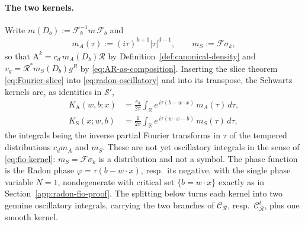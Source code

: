 \documentclass[12pt]{article}
\numberwithin{equation}{section}
\numberwithin{figure}{section}
\numberwithin{equation}{section}
\newcommand{\R}{\mathbb{R}}
\newcommand{\abs}[1]{\left|#1\right|}
\begin{document}
\paragraph{The two kernels.}
Write $m(D_b):=\mathcal F_b^{-1}m\,\mathcal F_b$ and
\begin{align}
    m_A(\tau):=(i\tau)^{k+1}\abs{\tau}^{d-1},
    \qquad
    m_S:=\mathcal F\sigma_k ,
    \label{eq:two-multipliers}
\end{align}
so that $\mathrm{A}^k=c_d\,m_A(D_b)\mathcal R$ by Definition~\ref{def:canonical-density}
and $v_g=\mathcal R^{*}m_S(D_b)g^{R}$ by \eqref{eq:AR-as-composition}.  Inserting the slice theorem \eqref{eq:Fourier-slice} into \eqref{eq:radon-oscillatory}
and into its transpose, the Schwartz kernels are, as identities in $\mathcal S'$,
\begin{align}
    K_{\mathrm A}(w,b;x)
    &=\frac{c_d}{2\pi}\int_{\R}e^{\,i\tau(b-w\cdot x)}\,m_A(\tau)\,d\tau,
    \label{eq:analysis-kernel}\\
    K_{\mathrm S}(x;w,b)
    &=\frac{1}{2\pi}\int_{\R}e^{\,i\tau(w\cdot x-b)}\,m_S(\tau)\,d\tau ,
    \label{eq:synthesis-kernel}
\end{align}
the integrals being the inverse partial Fourier transforms in $\tau$ of the tempered
distributions $c_dm_A$ and $m_S$.  These are not yet oscillatory integrals in the sense
of \eqref{eq:fio-kernel}: $m_S=\mathcal F\sigma_k$ is a distribution and not a symbol.  
The phase function is the Radon phase $\varphi=\tau(b-w\cdot x)$, 
resp.\ its negative, with the single phase
variable $N=1$, nondegenerate with critical set $\{b=w\cdot x\}$ exactly as in
Section~\ref{app:radon-fio-proof}.  The splitting below turns each kernel into two
genuine oscillatory integrals, carrying the two branches of $\mathcal{C}_{\mathcal R}$,
resp.\ $\mathcal{C}_{\mathcal R}^{t}$, plus one smooth kernel.
\end{document}
